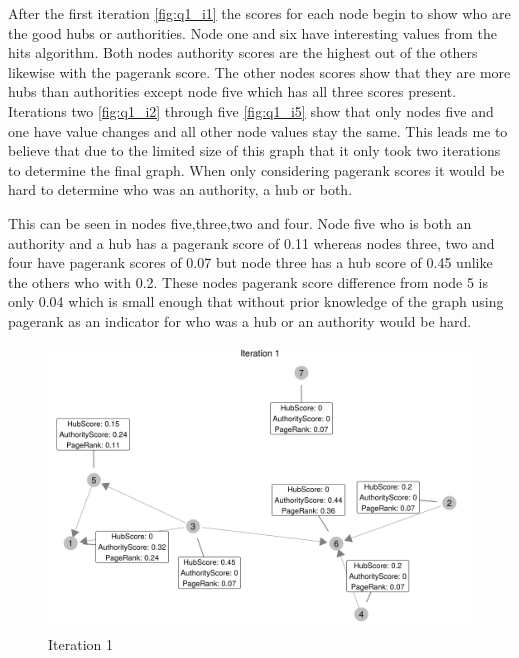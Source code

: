 \documentclass[11pt]{article}
\begin{document}
After the first iteration \autoref{fig:q1_i1} the scores for each node begin to show who are the good hubs or authorities. Node one and six have interesting values from the hits algorithm. Both nodes authority scores are the highest out of the others likewise with the pagerank score. The other nodes scores show that they are more hubs than authorities except node five which has all three scores present. Iterations two \autoref{fig:q1_i2} through five  \autoref{fig:q1_i5} show that only nodes five and one have value changes and all other node values stay the same. This leads me to believe that due to the limited size of this graph that it only took two iterations to determine the final graph. When only considering pagerank scores it would be hard to determine who was an authority, a hub or both. 

This can be seen in nodes five,three,two and four. Node five who is both an authority and a hub has a pagerank score of 0.11 whereas nodes three, two and four have pagerank scores of 0.07 but node three has a hub score of 0.45 unlike the others who with 0.2. These nodes pagerank score difference from node 5 is only 0.04 which is small enough that without prior knowledge of the graph using pagerank as an indicator for who was a hub or an authority would be hard.
\begin{figure}[H]
\centering
\includegraphics[scale=.8]{q1_iteration1.png}
\caption{Iteration 1}
\label{fig:q1_i1}
\end{figure}
\end{document}
